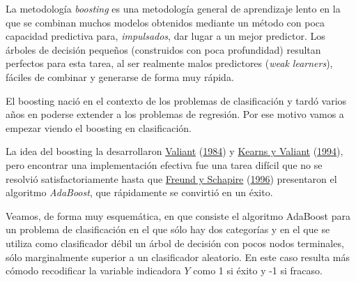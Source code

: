 \documentclass[
  spanish,
]{book}
\theoremstyle{break}
\theoremstyle{definition}
\theoremstyle{definition}
\theoremstyle{definition}
\theoremstyle{definition}
\theoremstyle{remark}
\begin{document}
La metodología \emph{boosting} es una metodología general de aprendizaje lento en la que se combinan muchos modelos obtenidos mediante un método con poca capacidad predictiva para, \emph{impulsados}, dar lugar a un mejor predictor. Los árboles de decisión pequeños (construidos con poca profundidad) resultan perfectos para esta tarea, al ser realmente malos predictores (\emph{weak learners}), fáciles de combinar y generarse de forma muy rápida.

El boosting nació en el contexto de los problemas de clasificación y tardó varios años en poderse extender a los problemas de regresión. Por ese motivo vamos a empezar viendo el boosting en clasificación.

La idea del boosting la desarrollaron \protect\hyperlink{ref-valiant1984theory}{Valiant} (\protect\hyperlink{ref-valiant1984theory}{1984}) y \protect\hyperlink{ref-kearns_cryptographic_1994}{Kearns y Valiant} (\protect\hyperlink{ref-kearns_cryptographic_1994}{1994}), pero encontrar una implementación efectiva fue una tarea difícil que no se resolvió satisfactoriamente hasta que \protect\hyperlink{ref-freund1996schapire}{Freund y Schapire} (\protect\hyperlink{ref-freund1996schapire}{1996}) presentaron el algoritmo \emph{AdaBoost}, que rápidamente se convirtió en un éxito.

Veamos, de forma muy esquemática, en que consiste el algoritmo AdaBoost para un problema de clasificación en el que sólo hay dos categorías y en el que se utiliza como clasificador débil un árbol de decisión con pocos nodos terminales, sólo marginalmente superior a un clasificador aleatorio.
En este caso resulta más cómodo recodificar la variable indicadora \(Y\) como 1 si éxito y -1 si fracaso.
\end{document}
